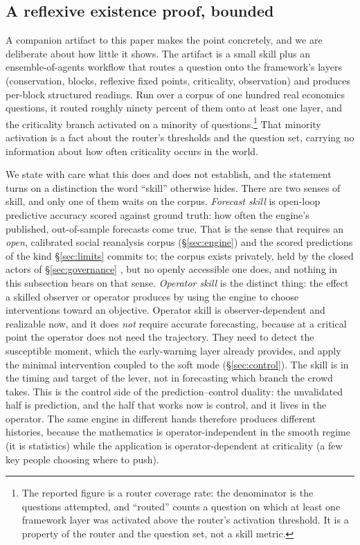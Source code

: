 \documentclass[11pt]{article}
\begin{document}
\subsection{A reflexive existence proof, bounded}

A companion artifact to this paper makes the point concretely, and we are deliberate about how little it shows. The artifact is a small skill plus an ensemble-of-agents workflow that routes a question onto the framework's layers (conservation, blocks, reflexive fixed points, criticality, observation) and produces per-block structured readings. Run over a corpus of one hundred real economics questions, it routed roughly ninety percent of them onto at least one layer, and the criticality branch activated on a minority of questions.\footnote{The reported figure is a router coverage rate: the denominator is the questions attempted, and ``routed'' counts a question on which at least one framework layer was activated above the router's activation threshold. It is a property of the router and the question set, not a skill metric.} That minority activation is a fact about the router's thresholds and the question set, carrying no information about how often criticality occurs in the world.

We state with care what this does and does not establish, and the statement turns on a distinction the word ``skill'' otherwise hides. There are two senses of skill, and only one of them waits on the corpus. \emph{Forecast skill} is open-loop predictive accuracy scored against ground truth: how often the engine's published, out-of-sample forecasts come true. That is the sense that requires an \emph{open}, calibrated social reanalysis corpus (\S\ref{sec:engine}) and the scored predictions of the kind \S\ref{sec:limits} commits to; the corpus exists privately, held by the closed actors of \S\ref{sec:governance} \cite{kramer2014}, but no openly accessible one does, and nothing in this subsection bears on that sense. \emph{Operator skill} is the distinct thing: the effect a skilled observer or operator produces by using the engine to choose interventions toward an objective. Operator skill is observer-dependent and realizable now, and it does \emph{not} require accurate forecasting, because at a critical point the operator does not need the trajectory. They need to detect the susceptible moment, which the early-warning layer already provides, and apply the minimal intervention coupled to the soft mode (\S\ref{sec:control}). The skill is in the timing and target of the lever, not in forecasting which branch the crowd takes. This is the control side of the prediction--control duality: the unvalidated half is prediction, and the half that works now is control, and it lives in the operator. The same engine in different hands therefore produces different histories, because the mathematics is operator-independent in the smooth regime (it is statistics) while the application is operator-dependent at criticality (a few key people choosing where to push).
\end{document}
